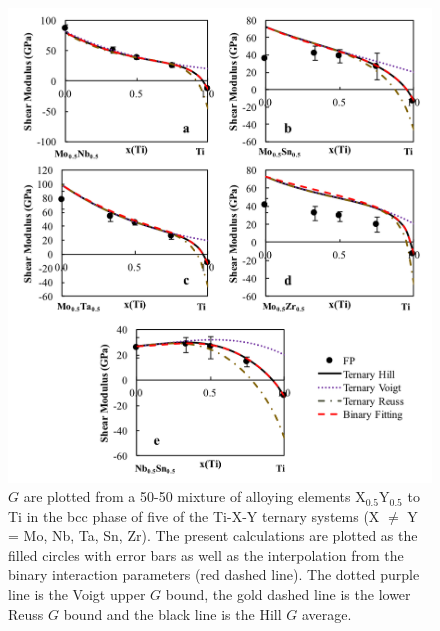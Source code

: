 \pagebreak
\begin{figure}[H]
	\centering
	\includegraphics[width=\textwidth]{Chapter-6/Figures/tixyshear1.png}
	\caption{$G$ are plotted from a 50-50 mixture of alloying elements X$_{0.5}$Y$_{0.5}$ to Ti in the bcc phase of five of the Ti-X-Y ternary systems (X $\neq$ Y = Mo, Nb, Ta, Sn, Zr). The present calculations are plotted as the filled circles with error bars as well as the interpolation from the binary interaction parameters (red dashed line). The dotted purple line is the Voigt upper $G$ bound, the gold dashed line is the lower Reuss $G$ bound and the black line is the Hill $G$ average.}
	\label{Ch6-figure:tixyshear1}
\end{figure}


